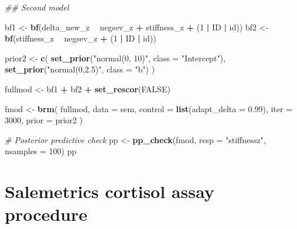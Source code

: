 \documentclass[man,floatsintext]{apa6}
\newenvironment{Shaded}{\begin{snugshade}}{\end{snugshade}}
\newcommand{\CommentTok}[1]{\textcolor[rgb]{0.56,0.35,0.01}{\textit{#1}}}
\newcommand{\DataTypeTok}[1]{\textcolor[rgb]{0.13,0.29,0.53}{#1}}
\newcommand{\DecValTok}[1]{\textcolor[rgb]{0.00,0.00,0.81}{#1}}
\newcommand{\FloatTok}[1]{\textcolor[rgb]{0.00,0.00,0.81}{#1}}
\newcommand{\KeywordTok}[1]{\textcolor[rgb]{0.13,0.29,0.53}{\textbf{#1}}}
\newcommand{\NormalTok}[1]{#1}
\newcommand{\OperatorTok}[1]{\textcolor[rgb]{0.81,0.36,0.00}{\textbf{#1}}}
\newcommand{\OtherTok}[1]{\textcolor[rgb]{0.56,0.35,0.01}{#1}}
\newcommand{\StringTok}[1]{\textcolor[rgb]{0.31,0.60,0.02}{#1}}
\begin{document}
\begin{Shaded}
\begin{Highlighting}[]
\CommentTok{## Second model}

\NormalTok{bf1 <-}\StringTok{ }\KeywordTok{bf}\NormalTok{(delta_new_z }\OperatorTok{~}\StringTok{ }\NormalTok{negsev_z }\OperatorTok{+}\StringTok{ }\NormalTok{stiffness_z }\OperatorTok{+}\StringTok{ }\NormalTok{(}\DecValTok{1} \OperatorTok{|}\StringTok{ }\NormalTok{ID }\OperatorTok{|}\StringTok{ }\NormalTok{id))}
\NormalTok{bf2 <-}\StringTok{ }\KeywordTok{bf}\NormalTok{(stiffness_z }\OperatorTok{~}\StringTok{ }\NormalTok{negsev_z }\OperatorTok{+}\StringTok{ }\NormalTok{(}\DecValTok{1} \OperatorTok{|}\StringTok{ }\NormalTok{ID }\OperatorTok{|}\StringTok{ }\NormalTok{id))}

\NormalTok{prior2 <-}\StringTok{ }\KeywordTok{c}\NormalTok{(}
  \KeywordTok{set_prior}\NormalTok{(}\StringTok{"normal(0, 10)"}\NormalTok{, }\DataTypeTok{class =} \StringTok{"Intercept"}\NormalTok{),}
  \KeywordTok{set_prior}\NormalTok{(}\StringTok{"normal(0,2.5)"}\NormalTok{, }\DataTypeTok{class =} \StringTok{"b"}\NormalTok{)}
\NormalTok{)}

\NormalTok{fullmod <-}\StringTok{ }\NormalTok{bf1 }\OperatorTok{+}\StringTok{ }\NormalTok{bf2 }\OperatorTok{+}\StringTok{ }\KeywordTok{set_rescor}\NormalTok{(}\OtherTok{FALSE}\NormalTok{)}

\NormalTok{fmod <-}\StringTok{ }\KeywordTok{brm}\NormalTok{(}
\NormalTok{  fullmod,}
  \DataTypeTok{data =}\NormalTok{ sem,}
  \DataTypeTok{control =} \KeywordTok{list}\NormalTok{(}\DataTypeTok{adapt_delta =} \FloatTok{0.99}\NormalTok{),}
  \DataTypeTok{iter =} \DecValTok{3000}\NormalTok{,}
  \DataTypeTok{prior =}\NormalTok{ prior2}
\NormalTok{)}

\CommentTok{# Posterior predictive check}
\NormalTok{pp <-}\StringTok{ }\KeywordTok{pp_check}\NormalTok{(fmod, }\DataTypeTok{resp =} \StringTok{"stiffnessz"}\NormalTok{, }\DataTypeTok{nsamples =} \DecValTok{100}\NormalTok{)}
\NormalTok{pp}
\end{Highlighting}
\end{Shaded}

\hypertarget{salemetrics-cortisol-assay-procedure}{%
\section{Salemetrics cortisol assay procedure}\label{salemetrics-cortisol-assay-procedure}}



\end{document}
